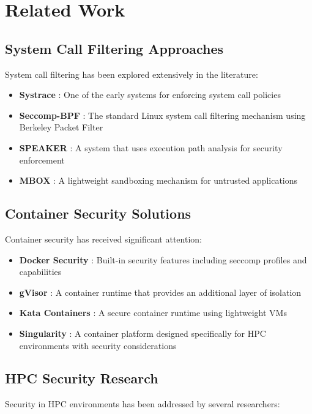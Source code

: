 \documentclass[conference]{IEEEtran}
\begin{document}
\section{Related Work}
\label{sec:related}

\subsection{System Call Filtering Approaches}
System call filtering has been explored extensively in the literature:

\begin{itemize}
\item \textbf{Systrace} \cite{provos2003improving}: One of the early systems for enforcing system call policies
\item \textbf{Seccomp-BPF} \cite{edge2015seccomp}: The standard Linux system call filtering mechanism using Berkeley Packet Filter
\item \textbf{SPEAKER} \cite{li2018speaker}: A system that uses execution path analysis for security enforcement
\item \textbf{MBOX} \cite{kim2013practical}: A lightweight sandboxing mechanism for untrusted applications
\end{itemize}

\subsection{Container Security Solutions}
Container security has received significant attention:

\begin{itemize}
\item \textbf{Docker Security} \cite{bui2015analysis}: Built-in security features including seccomp profiles and capabilities
\item \textbf{gVisor} \cite{google2018gvisor}: A container runtime that provides an additional layer of isolation
\item \textbf{Kata Containers} \cite{kata2018architecture}: A secure container runtime using lightweight VMs
\item \textbf{Singularity} \cite{kurtzer2017singularity}: A container platform designed specifically for HPC environments with security considerations
\end{itemize}

\subsection{HPC Security Research}
Security in HPC environments has been addressed by several researchers:
\end{document}
